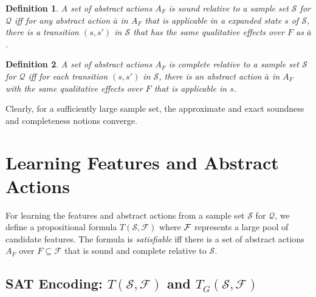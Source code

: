 \documentclass[letterpaper]{article} %
\newtheorem{definition}{Definition}
\newcommand{\Q}{\mathcal{Q}}
\newcommand{\F}{\mathcal{F}}
\renewcommand{\S}{\mathcal{S}}
\begin{document}
\begin{definition}
  A set of abstract actions $A_F$ is sound \emph{relative to a  sample set} $\S$ for $\Q$
  iff for  any  abstract action $\bar{a}$ in $A_F$ that is applicable in  a expanded state $s$ of $\S$,
  there is a transition $(s,s')$ in $\S$ that has the same qualitative  effects over $F$ as $\bar{a}$.
\end{definition}

\begin{definition}
  A set of abstract actions $A_F$ is complete   \emph{relative to a sample set} $\S$ for $\Q$
  iff for each transition  $(s,s')$ in  $\S$, there is an abstract action $\bar{a}$ in $A_F$
  with the same qualitative effects over $F$ that is applicable in $s$.
\end{definition}

Clearly, for a sufficiently large sample set, the approximate and exact  soundness and completeness notions  converge.


\section{Learning Features and Abstract Actions}

For learning the features and abstract actions from a sample set $\S$ for $\Q$, 
we define a propositional formula $T(\S,\F)$ where  $\cal F$ represents a large
pool of candidate features. The formula is  \emph{satisfiable} iff there is
a set of abstract actions $A_F$ over  $F \subseteq \F$ that is sound and complete
relative to $\S$. 

\subsection{SAT Encoding: $T(\S,\F)$ and $T_G(\S,\F)$}
\end{document}

